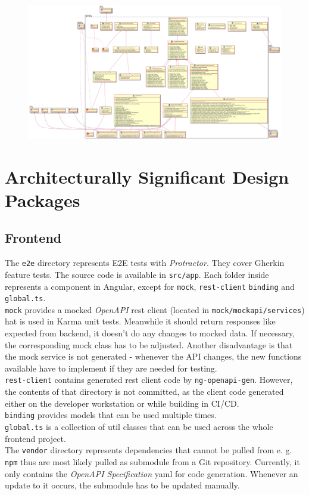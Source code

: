 \documentclass[a4paper,12pt,chapterprefix=false,bibliography=totoc,listof=totoc,]{scrreprt}
\begin{document}
\begin{figure}
    \centering
    \includegraphics[width=\textwidth]{diagramms/BackendOverview.png}
    \label{fig:backend-overview}
\end{figure}
\clearpage

\section{Architecturally Significant Design Packages}
\subsection{Frontend}
The \texttt{e2e} directory represents E2E tests with \textit{Protractor}. They cover Gherkin feature tests. The source code is available in \texttt{src/app}. Each folder inside represents a component in Angular, except for \texttt{mock}, \texttt{rest-client} \texttt{binding} and \texttt{global.ts}. \\
\texttt{mock} provides a mocked \textit{OpenAPI} \gls{rest} client (located in \texttt{mock/mockapi/services}) hat is used in Karma unit tests. Meanwhile it should return responses like expected from backend, it doesn't do any changes to mocked data. If necessary, the corresponding mock class has to be adjusted. Another disadvantage is that the mock service is not generated - whenever the API changes, the new functions available have to implement if they are needed for testing. \\
\texttt{rest-client} contains generated \gls{rest} client code by \texttt{ng-openapi-gen}. However, the contents of that directory is not committed, as the client code generated either on the developer workstation or while building in CI/CD. \\
\texttt{binding} provides models that can be used multiple times. \\
\texttt{global.ts} is a collection of util classes that can be used across the whole frontend project. \\
The \texttt{vendor} directory represents dependencies that cannot be pulled from e. g. \texttt{npm} thus are most likely pulled as submodule from a Git repository. Currently, it only contains the \textit{OpenAPI Specification} \gls{yaml} for code generation. Whenever an update to it occurs, the submodule has to be updated manually.
\end{document}
